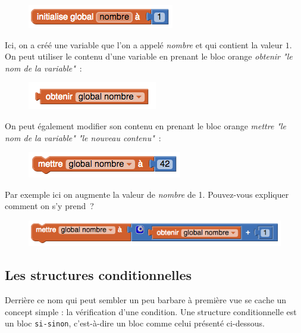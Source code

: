 \documentclass[12t,a4paper]{article}
\begin{document}
\begin{figure}[h!]
\centering
\includegraphics[scale=0.6]{Initialisation.png}
\end{figure}

Ici, on a créé une variable que l'on a appelé \textit{nombre} et qui contient la valeur $1$.\\

On peut utiliser le contenu d'une variable en prenant le bloc orange \textit{obtenir "le nom de la variable"}~:
\begin{figure}[h!]
\centering
\includegraphics[scale=0.6]{get.png}
\end{figure}

On peut également modifier son contenu en prenant le bloc orange \textit{mettre "le nom de la variable" "le nouveau contenu"}~:
\begin{figure}[h!]
\centering
\includegraphics[scale=0.6]{set.png}
\end{figure}

Par exemple ici on augmente la valeur de \textit{nombre} de 1. Pouvez-vous expliquer comment on s'y prend~?

\begin{figure}[h!]
\centering
\includegraphics[scale=0.6]{set2.png}
\end{figure}



\subsection{Les structures conditionnelles}

Derrière ce nom qui peut sembler un peu barbare à première vue se cache un concept simple : la vérification d'une condition. Une structure conditionnelle est un bloc \texttt{si-sinon}, c'est-à-dire un bloc comme celui présenté ci-dessous. \\
\end{document}
